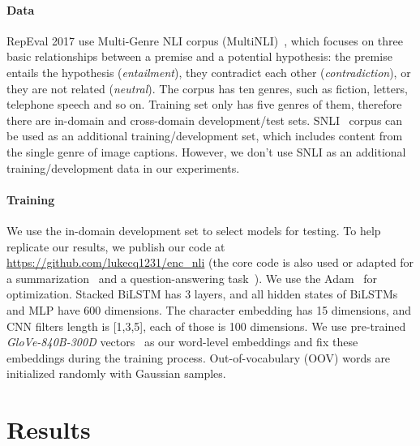 \documentclass[11pt,letterpaper]{article}
\begin{document}
\paragraph{Data}
RepEval 2017 use Multi-Genre NLI corpus (MultiNLI)~\citep{DBLP:journals/corr/WilliamsNB17}, which focuses on three basic relationships between a premise and a potential hypothesis: the premise entails the hypothesis (\textit{entailment}), they contradict each other (\textit{contradiction}), or they are not related (\textit{neutral}). The corpus has ten genres, such as fiction, letters, telephone speech and so on. Training set only has five genres of them, therefore there are in-domain and cross-domain development/test sets. SNLI~\citep{Bowman:D15-1075} corpus can be used as an additional training/development set, which includes content from the single genre of image captions. However, we don't use SNLI as an additional training/development data in our experiments.

\paragraph{Training}
We use the in-domain development set to select models for testing. To help replicate our results, we publish our code at \url{https://github.com/lukecq1231/enc_nli} (the core code is also used or adapted for a summarization~\citep{DBLP:conf/ijcai/ChenZLWJ16} and a question-answering task~\citep{Zhang:qa:2017}). We use the Adam~\citep{DBLP:journals/corr/KingmaB14} for optimization. Stacked BiLSTM has 3 layers, and all hidden states of BiLSTMs and MLP have 600 dimensions. The character embedding has 15 dimensions, and CNN filters length is [1,3,5], each of those is 100 dimensions. We use pre-trained \textit{GloVe-840B-300D} vectors~\citep{Pennington:D14-1162} as our word-level embeddings and fix these embeddings during the training process. Out-of-vocabulary (OOV) words are initialized randomly with Gaussian samples. 

\section{Results}
\end{document}
